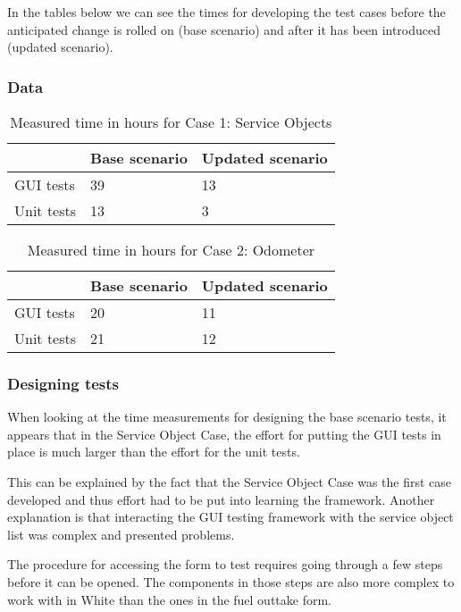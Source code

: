 \documentclass{article}
\begin{document}
		In the tables below we can see the times for developing the test cases before the anticipated change is rolled on (base scenario) and after it has been introduced (updated scenario).

			\subsubsection{Data}

			\begin{table}[h!]
				\begin{tabular}{l | l | l |}
				               & {Base scenario} & {Updated scenario}     \\
				\hline
				 GUI tests     & 39    &  13    \\
				 Unit tests    & 13    &  3   \\
				 \end{tabular}
				 \caption{Measured time in hours for Case 1: Service Objects}
			 \end{table}

			\begin{table}[h!]
				\begin{tabular}{l | l | l |}
				               & {Base scenario} & {Updated scenario}     \\
				\hline
				 GUI tests     &  20     & 11    \\
				 Unit tests    &  21     & 12    \\
				 \end{tabular}
				 \caption{Measured time in hours for Case 2: Odometer}
			 \end{table}

			\subsubsection{Designing tests}
 			When looking at the time measurements for designing the base scenario tests, it appears that in the Service Object Case, the effort for putting the GUI tests in place is much larger than the effort for the unit tests. 

 			This can be explained by the fact that the Service Object Case was the first case developed and thus effort had to be put into learning the framework. Another explanation is that interacting the GUI testing framework with the service object list was complex and presented problems.  

 			The procedure for accessing the form to test requires going through a few steps before it can be opened. The components in those steps are also more complex to work with in White than the ones in the fuel outtake form.
\end{document}
